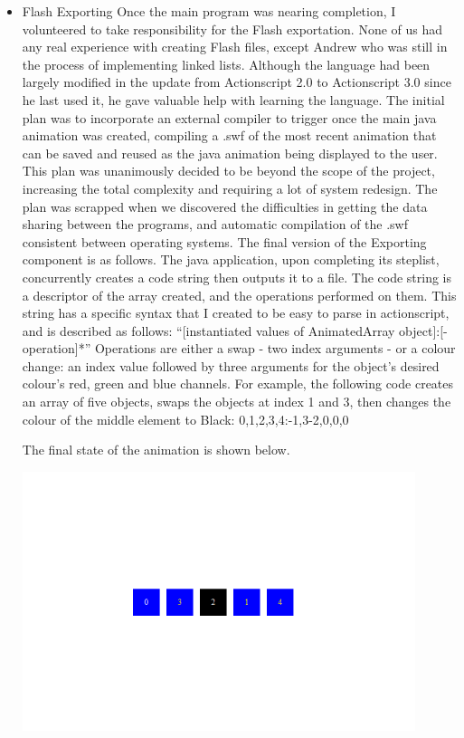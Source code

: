 \documentclass{l3proj}
\begin{document}
\begin{itemize}
\item Flash Exporting 
 Once the main program was nearing completion, I volunteered to take responsibility for the Flash exportation. None of us had any real experience with creating Flash files, except Andrew who was still in the process of implementing linked lists. Although the language had been largely modified in the update from Actionscript 2.0 to Actionscript 3.0 since he last used it, he gave valuable help with learning the language.
The initial plan was to incorporate an external compiler to trigger once the main java animation was created, compiling a .swf of the most recent animation that can be saved and reused as the java animation being displayed to the user. This plan was unanimously decided to be beyond the scope of the project, increasing the total complexity and requiring a lot of system redesign. The plan was scrapped when we discovered the difficulties in getting the data sharing between the programs, and automatic compilation of the .swf consistent between operating systems.
 The final version of the Exporting component is as follows. The java application, upon completing its steplist, concurrently creates a code string then outputs it to a file. The code string is a descriptor of the array created, and the operations performed on them. This string has a specific syntax that I created to be easy to parse in actionscript, and is described as follows:
“[instantiated values of AnimatedArray object]:[-operation]*”
Operations are either a swap - two index arguments - or a colour change: an index value followed by three arguments for the object’s desired colour’s red, green and blue channels. For example, the following code creates an array of five objects, swaps the objects at index 1 and 3, then changes the colour of the middle element to Black: 
0,1,2,3,4:-1,3-2,0,0,0

The final state of the animation is shown below.

\includegraphics[width=115mm]{images/flash1.png}



\end{itemize}
\end{document}

